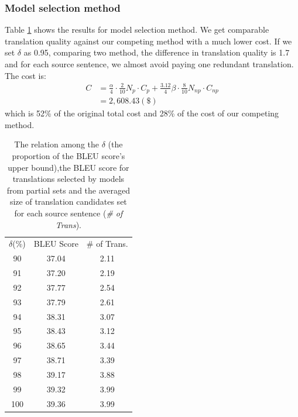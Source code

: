 \documentclass[11pt,letterpaper]{article}
\begin{document}
 \subsubsection{Model selection method}
 Table \ref{orderanother} shows the results for model selection method. We get comparable translation quality against our competing method with a much lower cost. If we set $\delta$ as 0.95, comparing two method, the difference in translation quality is 1.7 and for each source sentence, we almost avoid paying one redundant translation. The cost is:
 \begin{align*}
  C& = \frac{\alpha}{4} \cdot \frac{2}{10} N_{p}\cdot C_{p}  + \frac{3.12}{4} \beta\cdot \frac{8}{10} N_{np} \cdot C_{np}\\
   & = 2,608.43 (\$)
 \end{align*}
 which is 52\% of the original total cost and  28\% of the cost of our competing method.
 \begin{table}[h]
 \center
\begin{tabular}{c|c|c}
\hline
$\delta$(\%) & BLEU Score & \# of Trans. \\ \hhline{===}
90    & 37.04      & 2.11             \\
91    & 37.20      & 2.19             \\
92    & 37.77      & 2.54             \\
93    & 37.79      & 2.61             \\
94    & 38.31      & 3.07             \\
95    & 38.43      & 3.12             \\
96    & 38.65      & 3.44             \\
97    & 38.71      & 3.39             \\
98    & 39.17      & 3.88             \\
99    & 39.32      & 3.99             \\
100   & 39.36      & 3.99             \\ \hline
\end{tabular}
\caption{The relation among the $\delta$ (the proportion of the BLEU score's upper bound),the BLEU score for translations selected by models from partial sets and the averaged size of translation candidates set for each source sentence (\textit{\# of Trans}).  }
    \label{orderanother}
\end{table}
\end{document}
